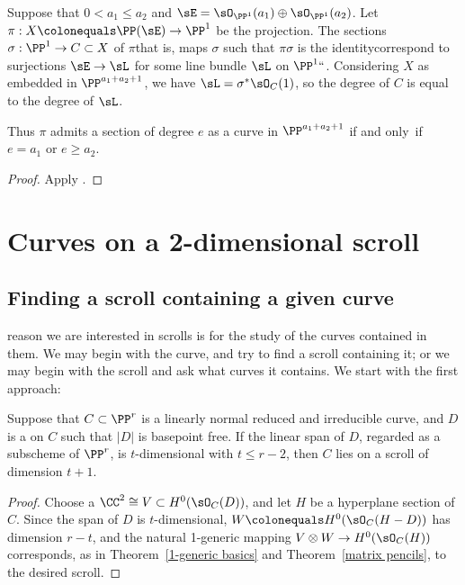 \begin{proposition} Suppose that $0<a_1\leq a_2$ and
$\sE = \sO_{\PP^1}(a_1)\oplus \sO_{\PP^1}(a_2)$. Let $\pi: X\colonequals
\PP(\sE) \to \PP^1$ be the projection.
The sections $\sigma:\PP^1 \to C\subset X$ of $\pi$\emdash that is,
maps $\sigma$ such that $\pi\sigma$ is the
identity\emdash correspond to surjections
$\sE \to \sL$ for some line bundle $\sL$ on $\PP^1` `$. Considering  $X$
as embedded in
$\PP^{a_1+a_2+1}$, we have $\sL = \sigma^*\sO_C(1)$, so the degree of $C$
is equal
to the degree of $\sL$.

Thus $\pi$ admits a section of degree $e$ as a curve in $\PP^{a_1+a_2+1}$
if and only~if
$e = a_1$ or $e\geq a_2$.
\unif
\end{proposition}

\begin{proof}
Apply \cite[II.7.12]{Hartshorne1977}.
\end{proof}

\section{Curves on a 2-dimensional scroll}\label{curves on scrolls}

\subsection*{Finding a scroll containing a given curve}
reason we are interested in scrolls is for the study of the curves
contained in them.
We may begin with the curve, and try to 
find a scroll containing it;
or we may begin with the scroll and ask
what curves it contains. 
We start with the first approach:

\begin{proposition}
Suppose that $C\subset \PP^r$ is a linearly normal reduced and irreducible
curve, and $D$ is a  
%
on $C$ such that $|D|$ is basepoint
%
free. If the linear span of $D$, regarded as a subscheme of $\PP^{r}$,
is $t$-dimensional with $t\leq r-2$, then $C$ lies on a scroll of
dimension $t+1$.
\unif
\end{proposition}

\begin{proof}
Choose a
%
$\CC^2\cong V \subset H^0(\sO_C(D))$,
and let $H$ be a hyperplane section of $C$. Since the span of $D$ is
$t$-dimensional, 
$W\colonequals H^0(\sO_C(H-D))$ has dimension $r-t$,
and the natural 1-generic mapping
$V\otimes W \to H^0(\sO_C(H))$ corresponds, as in Theorem~\ref{1-generic
basics} and Theorem~\ref{matrix pencils}, to the desired scroll.
\end{proof}

